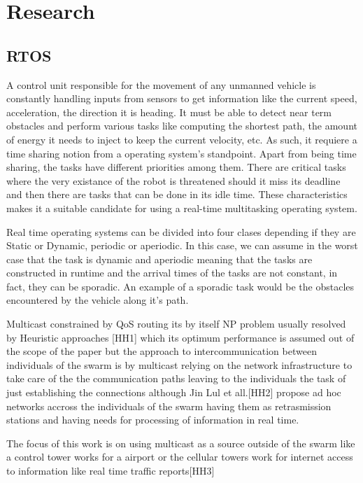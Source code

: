 \documentclass[journal]{IEEEtran}
\begin{document}
\section{Research}
	\subsection{RTOS}
	A control unit responsible for the movement of any unmanned vehicle is constantly handling inputs from sensors to get information like the current speed, acceleration, the direction it is heading. It must be able to detect near term obstacles and perform various tasks like computing the shortest path, the amount of energy it needs to inject to keep the current velocity, etc. As such, it requiere a time sharing notion from a operating system's standpoint. Apart from being time sharing, the tasks have different priorities among them. There are critical tasks where the very existance of the robot is threatened should it miss its deadline and then there are tasks that can be done in its idle time. These characteristics makes it a suitable candidate for using a real-time multitasking operating system.

Real time operating systems can be divided into four clases depending if they are Static or Dynamic, periodic or aperiodic. In this case, we can assume in the worst case that the task is dynamic and aperiodic meaning that the tasks are constructed in runtime and the arrival times of the tasks are not constant, in fact, they can be sporadic. An example of a sporadic task would be the obstacles encountered by the vehicle along it's path.

Multicast constrained by QoS routing its by itself NP problem usually resolved by Heuristic approaches [HH1] which its optimum performance is assumed out of the scope of the paper but the approach to  intercommunication between individuals of the swarm is by multicast relying on the network infrastructure to take care of the the communication paths leaving to the individuals the task of just establishing the connections although Jin Lul et all.[HH2] propose ad hoc networks accross the individuals of the swarm having them as retrasmission stations and having needs for processing of information in real time.


The focus of this work is on using multicast as a source outside of the swarm like a control tower works for a airport or the cellular towers work for internet access to information like real time traffic reports[HH3]
\end{document}
